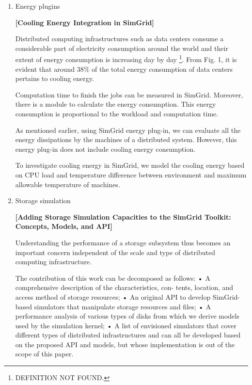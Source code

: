 \documentclass[a4paper,titlepage]{article}
\begin{document}
\begin{enumerate}
\begin{enumerate}
\textbf{[Versatile, Scalable, and Accurate Simulation of Distributed Applications and Platforms]}

Table 1: State-of-the-art simulators from various communities and modeling approaches.

\item Energy plugins
\label{sec-3-1-3}

\textbf{[Cooling Energy Integration in SimGrid]}

Distributed computing infrastructures such as data centers
consume a considerable part of electricity consumption around the world and their extent of energy consumption is increasing day by day \footnote{DEFINITION NOT FOUND.}. From Fig. 1, it is evident that around 38\% of the total energy consumption of data centers pertains to cooling energy. 

Computation time to finish the jobs can be measured in SimGrid. Moreover, there is a module to calculate the energy consumption. This energy consumption is proportional to the workload and computation time.

As mentioned earlier, using SimGrid energy plug-in, we
can evaluate all the energy dissipations by the machines of
a distributed system. However, this energy plug-in does not
include cooling energy consumption. 

To investigate cooling energy in SimGrid, we model the
cooling energy based on CPU load and temperature difference
between environment and maximum allowable temperature of
machines. 

\item Storage simulation
\label{sec-3-1-4}

\textbf{[Adding Storage Simulation Capacities to the SimGrid Toolkit: Concepts, Models, and API]}

 Understanding the performance
of a storage subsystem thus becomes an important concern
independent of the scale and type of distributed computing
infrastructure.

 The contribution
of this work can be decomposed as follows:
• A comprehensive description of the characteristics, con-
tents, location, and access method of storage resources;
• An original API to develop SimGrid-based simulators that
manipulate storage resources and files;
• A performance analysis of various types of disks from
which we derive models used by the simulation kernel;
• A list of envisioned simulators that cover different types
of distributed infrastructures and can all be developed
based on the proposed API and models, but whose
implementation is out of the scope of this paper.


\end{enumerate}
\end{enumerate}
\end{document}

